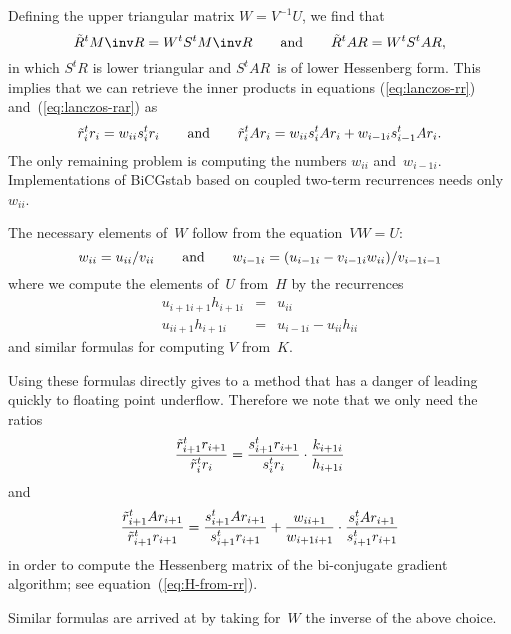 Defining the upper triangular matrix $W=V^{-1}U$, we find that
	\[ \tilde R^tM\inv R=W^tS^tM\inv R\qquad\hbox{and}\qquad
		 \tilde R^tAR=W^tS^tAR, \]
in which $S^tR$ is lower triangular and $S^tAR$~is of lower Hessenberg
form. This implies that we can retrieve the inner products in equations
(\ref{eq:lanczos-rr}) and~(\ref{eq:lanczos-rar}) as
\[ \tilde r_i^tr_i = w_{ii}s_i^tr_i \qquad\hbox{and}\qquad
\tilde r_i^tAr_i = w_{ii}s_i^tAr_i+w_{i-1i}s_{i-1}^tAr_i. \]
The only remaining problem is computing the numbers $w_{ii}$
and~$w_{i-1i}$. Implementations of BiCGstab based on coupled two-term
recurrences needs only~$w_{ii}$.

The necessary elements of~$W$ follow from the equation~$VW=U$:
	\begin{equation}
	w_{ii}=u_{ii}/v_{ii} \qquad\hbox{and}\qquad
	w_{i-1i}=(u_{i-1i}-v_{i-1i}w_{ii})/v_{i-1i-1}
	\label{eq:w-from-uv}\end{equation}
where we compute the elements of~$U$
from~$H$ by the recurrences
	\begin{eqnarray*}
		u_{i+1i+1}h_{i+1i}&=&u_{ii}\\
		u_{ii+1}h_{i+1i}&=&u_{i-1i}-u_{ii}h_{ii}
	\end{eqnarray*}
and similar formulas for computing $V$ from~$K$.

Using these formulas directly gives to a method that has a danger of
leading quickly to floating point underflow. Therefore we note that we
only need the ratios 
\begin{equation}
	{\tilde r_{i+1}^tr_{i+1}\over \tilde r_i^tr_i}=
		{s_{i+1}^tr_{i+1}\over s_i^tr_i}\cdot
		{k_{i+1i}\over h_{i+1i}}
	\label{eq:rr-cor}\end{equation}
and
\begin{equation}
	{\tilde r_{i+1}^tAr_{i+1}\over \tilde r_{i+1}^tr_{i+1}}=
		{s_{i+1}^tAr_{i+1}\over s_{i+1}^tr_{i+1}}+
		{w_{ii+1}\over w_{i+1i+1}}\cdot
		{s_{i}^tAr_{i+1}\over s_{i+1}^tr_{i+1}}
	\label{eq:rar-cor-inprod-sr}\end{equation}
in order to compute the Hessenberg matrix of the bi-conjugate gradient
algorithm; see equation~(\ref{eq:H-from-rr}).

Similar formulas are arrived
at by taking for~$W$ the inverse of the above choice.

